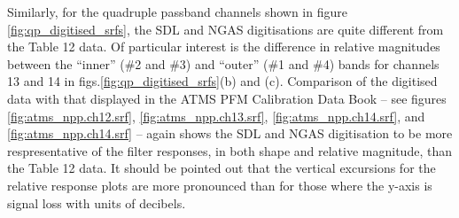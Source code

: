 Similarly, for the quadruple passband channels shown in figure \ref{fig:qp_digitised_srfs}, the SDL and NGAS digitisations are quite different from the Table 12 data. Of particular interest is the difference in relative magnitudes between the ``inner'' (\#2 and \#3) and ``outer'' (\#1 and \#4) bands for channels 13 and 14 in figs.\ref{fig:qp_digitised_srfs}(b) and (c). Comparison of the digitised data with that displayed in the ATMS PFM Calibration Data Book \cite{ATMS_PFM_CalLog} -- see figures \ref{fig:atms_npp.ch12.srf}, \ref{fig:atms_npp.ch13.srf}, \ref{fig:atms_npp.ch14.srf}, and \ref{fig:atms_npp.ch14.srf} -- again shows the SDL and NGAS digitisation to be more respresentative of the filter responses, in both shape and relative magnitude, than the Table 12 data. It should be pointed out that the vertical excursions for the relative response plots are more pronounced than for those where the y-axis is signal loss with units of decibels.
 

